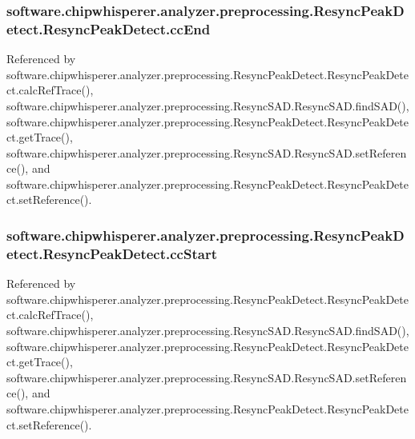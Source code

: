 \subsubsection[{cc\+End}]{\setlength{\rightskip}{0pt plus 5cm}software.\+chipwhisperer.\+analyzer.\+preprocessing.\+Resync\+Peak\+Detect.\+Resync\+Peak\+Detect.\+cc\+End}\label{classsoftware_1_1chipwhisperer_1_1analyzer_1_1preprocessing_1_1ResyncPeakDetect_1_1ResyncPeakDetect_a7c07c2c7e94e22ae7586b3042ea9af39}


Referenced by software.\+chipwhisperer.\+analyzer.\+preprocessing.\+Resync\+Peak\+Detect.\+Resync\+Peak\+Detect.\+calc\+Ref\+Trace(), software.\+chipwhisperer.\+analyzer.\+preprocessing.\+Resync\+S\+A\+D.\+Resync\+S\+A\+D.\+find\+S\+A\+D(), software.\+chipwhisperer.\+analyzer.\+preprocessing.\+Resync\+Peak\+Detect.\+Resync\+Peak\+Detect.\+get\+Trace(), software.\+chipwhisperer.\+analyzer.\+preprocessing.\+Resync\+S\+A\+D.\+Resync\+S\+A\+D.\+set\+Reference(), and software.\+chipwhisperer.\+analyzer.\+preprocessing.\+Resync\+Peak\+Detect.\+Resync\+Peak\+Detect.\+set\+Reference().

\hypertarget{classsoftware_1_1chipwhisperer_1_1analyzer_1_1preprocessing_1_1ResyncPeakDetect_1_1ResyncPeakDetect_a6ed3a041c3a1fd577fa268931788654b}{}
\subsubsection[{cc\+Start}]{\setlength{\rightskip}{0pt plus 5cm}software.\+chipwhisperer.\+analyzer.\+preprocessing.\+Resync\+Peak\+Detect.\+Resync\+Peak\+Detect.\+cc\+Start}\label{classsoftware_1_1chipwhisperer_1_1analyzer_1_1preprocessing_1_1ResyncPeakDetect_1_1ResyncPeakDetect_a6ed3a041c3a1fd577fa268931788654b}


Referenced by software.\+chipwhisperer.\+analyzer.\+preprocessing.\+Resync\+Peak\+Detect.\+Resync\+Peak\+Detect.\+calc\+Ref\+Trace(), software.\+chipwhisperer.\+analyzer.\+preprocessing.\+Resync\+S\+A\+D.\+Resync\+S\+A\+D.\+find\+S\+A\+D(), software.\+chipwhisperer.\+analyzer.\+preprocessing.\+Resync\+Peak\+Detect.\+Resync\+Peak\+Detect.\+get\+Trace(), software.\+chipwhisperer.\+analyzer.\+preprocessing.\+Resync\+S\+A\+D.\+Resync\+S\+A\+D.\+set\+Reference(), and software.\+chipwhisperer.\+analyzer.\+preprocessing.\+Resync\+Peak\+Detect.\+Resync\+Peak\+Detect.\+set\+Reference().


